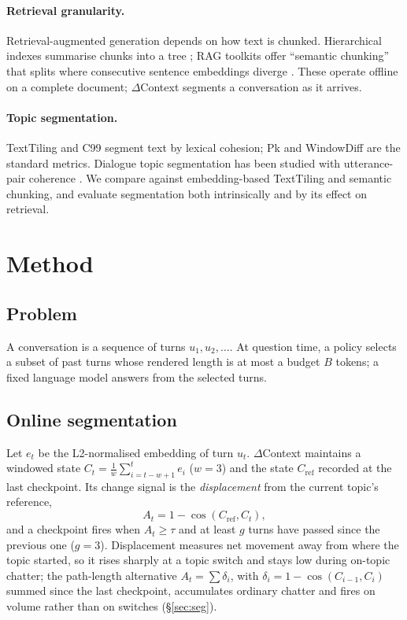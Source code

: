 \documentclass[11pt]{article}
\newcommand{\dc}{$\Delta$Context}
\begin{document}
\paragraph{Retrieval granularity.} Retrieval-augmented generation
\citep{lewis2020rag} depends on how text is chunked. Hierarchical indexes
summarise chunks into a tree \citep{sarthi2024raptor}; RAG toolkits offer
``semantic chunking'' that splits where consecutive sentence embeddings
diverge \citep{langchain2024semanticchunker}. These operate offline on a
complete document; \dc{} segments a conversation as it arrives.

\paragraph{Topic segmentation.} TextTiling \citep{hearst1997texttiling} and
C99 \citep{choi2000c99} segment text by lexical cohesion; Pk
\citep{beeferman1999statistical} and WindowDiff \citep{pevzner2002critique} are
the standard metrics. Dialogue topic segmentation has been studied with
utterance-pair coherence \citep{xing2021improving}. We compare against
embedding-based TextTiling and semantic chunking, and evaluate segmentation
both intrinsically and by its effect on retrieval.

\section{Method}
\label{sec:method}

\subsection{Problem}
A conversation is a sequence of turns $u_1, u_2, \dots$. At question time,
a policy selects a subset of past turns whose rendered length is at most a
budget $B$ tokens; a fixed language model answers from the selected turns.

\subsection{Online segmentation}
Let $e_t$ be the L2-normalised embedding of turn $u_t$. \dc{} maintains a
windowed state $C_t = \frac{1}{w}\sum_{i=t-w+1}^{t} e_i$ ($w = 3$) and the
state $C_{\mathrm{ref}}$ recorded at the last checkpoint. Its change signal is
the \emph{displacement} from the current topic's reference,
\begin{equation}
  A_t = 1 - \cos(C_{\mathrm{ref}}, C_t),
\end{equation}
and a checkpoint fires when $A_t \ge \tau$ and at least $g$ turns have passed
since the previous one ($g = 3$). Displacement measures net movement away from
where the topic started, so it rises sharply at a topic switch and stays low
during on-topic chatter; the path-length alternative
$A_t = \sum \delta_i$, with $\delta_i = 1 - \cos(C_{i-1}, C_i)$ summed since
the last checkpoint, accumulates ordinary chatter and fires on volume rather
than on switches (\S\ref{sec:seg}).
\end{document}
